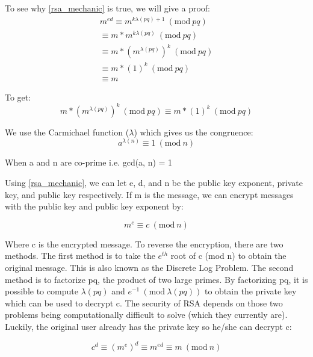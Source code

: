 \documentclass[acmlarge]{acmart}
\newcommand{\Mod}[1]{\ (\mathrm{mod}\ #1)}
\begin{document}
To see why \ref{rsa_mechanic} is true, we will give a proof:
\begin{equation}
\label{rsa_proof}
\begin{split}
	m^{ed} 
	\equiv m^{k\lambda(pq) + 1} \Mod{pq} \\
	\equiv m * m^{k\lambda(pq)} \Mod{pq} \\
	\equiv m * (m^{\lambda(pq)})^{k} \Mod{pq} \\
	\equiv m * (1)^{k} \Mod{pq} \\
	\equiv m
\end{split}
\end{equation}

To get:
\begin{equation}
	m * (m^{\lambda(pq)})^{k} \Mod{pq} \equiv m * (1)^{k} \Mod{pq}
\end{equation}

We use the Carmichael function ($\lambda$) which gives us the congruence:
\begin{equation}
\label{carmichael_fun}
	a^{\lambda(n)} \equiv 1 \Mod{n}
\end{equation}

When a and n are co-prime i.e. gcd(a, n) = 1

Using \ref{rsa_mechanic}, we can let e, d, and n be the public key exponent, private key, and public key respectively. If m is the message, we can encrypt messages with the public key and public key exponent by:

\begin{equation}
	m^{e} \equiv c \Mod{n}
\end{equation}

Where c is the encrypted message. To reverse the encryption, there are two methods. The first method is to take the $e^{th}$ root of c (mod n) to obtain the original message. This is also known as the Discrete Log Problem. The second method is to factorize pq, the product of two large primes. By factorizing pq, it is possible to compute $\lambda(pq)$ and $e^{-1} \Mod{\lambda(pq)}$ to obtain the private key which can be used to decrypt c. The security of RSA depends on those two problems being computationally difficult to solve (which they currently are). Luckily, the original user already has the private key so he/she can decrypt c:

\begin{equation}
	c^{d} \equiv (m^{e})^{d} \equiv m^{ed} \equiv m \Mod{n}
\end{equation}
\end{document}
